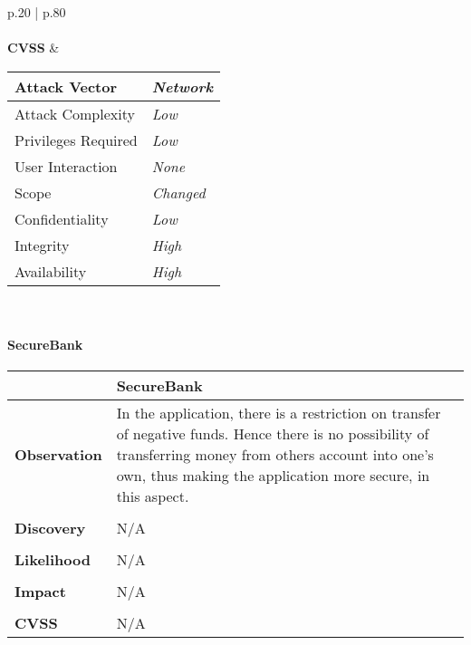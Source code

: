 \begin{longtable*}{p{.20\textwidth} | p{.80\textwidth}}
    \\\\
    \textbf{CVSS} &
      \begin{tabular}{| l | l |}
           \hline
           Attack Vector		& \textit{Network}\\
           \hline
           Attack Complexity	& \textit{Low} \\
           \hline
           Privileges Required & \textit{Low} \\
           \hline
           User Interaction	& \textit{None} \\
           \hline
           Scope		& \textit{Changed} \\
           \hline
           Confidentiality	& \textit{Low} \\
           \hline
           Integrity		& \textit{High} \\
           \hline
           Availability		& \textit{High} \\
           \hline
           \end{tabular}
    \\
    \hline
\end{longtable*}
\paragraph{SecureBank} \mbox{}
\begin{longtable*}{p{.20\textwidth} | p{.80\textwidth}}
    \hline
    & \textbf{SecureBank} \\
    \hline
    \textbf{Observation} &
       In the application, there is a restriction on transfer of negative funds. Hence there is no possibility of transferring money from others account into one's own, thus making the application more secure, in this aspect.
    \\\\
    \textbf{Discovery} &
    N/A
    \\\\
    \textbf{Likelihood} &
     N/A
    \\\\
    \textbf{Impact} &
      N/A
    \\\\
    \textbf{CVSS} &
    N/A
    \\
    \hline
\end{longtable*}
\clearpage